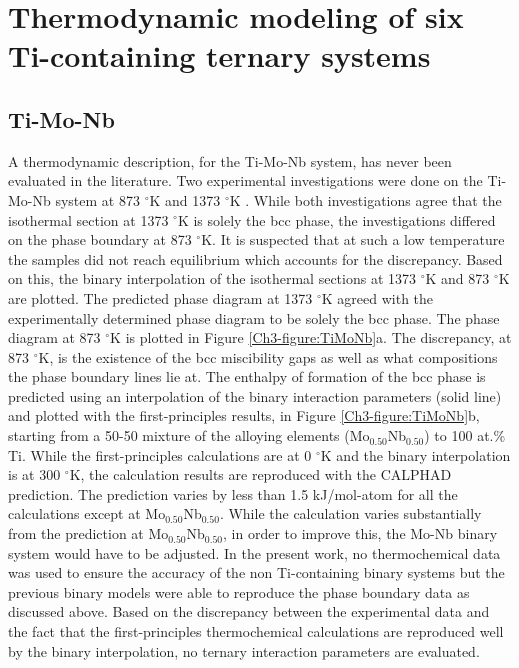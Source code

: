 \section{Thermodynamic modeling of six Ti-containing ternary systems}

\subsection{Ti-Mo-Nb}

A thermodynamic description, for the Ti-Mo-Nb system, has never been evaluated in the literature. Two experimental investigations were done on the Ti-Mo-Nb system at 873 $^{\circ}$K and 1373 $^{\circ}$K \cite{English1961,Prokoshkin1967}. While both investigations agree that the isothermal section at 1373 $^{\circ}$K is solely the bcc phase, the investigations differed on the phase boundary at 873 $^{\circ}$K. It is suspected that at such a low temperature the samples did not reach equilibrium which accounts for the discrepancy. Based on this, the binary interpolation of the isothermal sections at 1373 $^{\circ}$K and 873 $^{\circ}$K are plotted. The predicted phase diagram at 1373 $^{\circ}$K agreed with the experimentally determined phase diagram to be solely the bcc phase. The phase diagram at 873 $^{\circ}$K is plotted in Figure \ref{Ch3-figure:TiMoNb}a. The discrepancy, at 873 $^{\circ}$K, is the existence of the bcc miscibility gaps as well as what compositions the phase boundary lines lie at. The enthalpy of formation of the bcc phase is predicted using an interpolation of the binary interaction parameters (solid line) and plotted with the first-principles results, in Figure \ref{Ch3-figure:TiMoNb}b, starting from a 50-50 mixture of the alloying elements (Mo$_{0.50}$Nb$_{0.50}$) to 100 at.\% Ti. While the first-principles calculations are at 0 $^{\circ}$K and the binary interpolation is at 300 $^{\circ}$K, the calculation results are reproduced with the CALPHAD prediction. The prediction varies by less than 1.5 kJ/mol-atom for all the calculations except at Mo$_{0.50}$Nb$_{0.50}$. While the calculation varies substantially from the prediction at Mo$_{0.50}$Nb$_{0.50}$, in order to improve this, the Mo-Nb binary system would have to be adjusted. In the present work, no thermochemical data was used to ensure the accuracy of the non Ti-containing binary systems but the previous binary models were able to reproduce the phase boundary data as discussed above. Based on the discrepancy between the experimental data and the fact that the first-principles thermochemical calculations are reproduced well by the binary interpolation, no ternary interaction parameters are evaluated. 


